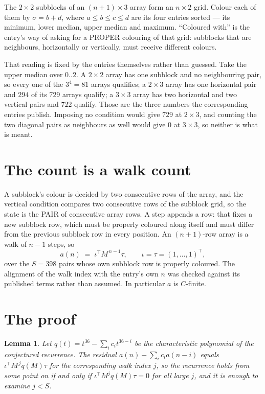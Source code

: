\documentclass[11pt,a4paper]{article}
\theoremstyle{plain}
\newtheorem{lemma}[theorem]{Lemma}
\theoremstyle{definition}
\begin{document}
The $2\times2$ subblocks of an $(n+1)\times3$ array form an
$n\times2$ grid. Colour each of them by $\sigma=b+d$, where $a\le b\le c\le d$ are its four entries sorted --- its minimum, lower median, upper median and maximum. ``Coloured with'' is the entry's way of
asking for a PROPER colouring of that grid: subblocks that are neighbours, horizontally or
vertically, must receive different colours.

That reading is fixed by the entries themselves rather than guessed. Take the upper median
over $0..2$. A $2\times2$ array has one subblock and no neighbouring pair, so every one of the
$3^4=81$ arrays qualifies; a $2\times3$ array has one horizontal pair and $294$ of its $729$
arrays qualify; a $3\times3$ array has two horizontal and two vertical pairs and $722$
qualify. Those are the three numbers the corresponding entries publish. Imposing no condition
would give $729$ at $2\times3$, and counting the two diagonal pairs as neighbours as well
would give $0$ at $3\times3$, so neither is what is meant.

\section{The count is a walk count}

A subblock's colour is decided by two consecutive rows of the array, and
the vertical condition compares two consecutive rows of the subblock grid, so the state is the
PAIR of consecutive array rows. A step appends a row: that fixes a new subblock row, which
must be properly coloured along itself and must differ from the previous subblock row in every
position. An $(n+1)$-row array is a walk of $n-1$ steps, so
\[
a(n)\;=\;\iota^{\!\top}M^{\,n-1}\tau,\qquad\iota=\tau=(1,\dots,1)^{\!\top},
\]
over the $S=398$ pairs whose own subblock row is properly coloured.
The alignment of the walk index with the entry's own $n$ was checked against its published
terms rather than assumed. In particular $a$ is $C$-finite.

\section{The proof}

\begin{lemma}\label{lem:crit}
Let $q(t)=t^{36}-\sum_i c_it^{36-i}$ be the characteristic polynomial of the
conjectured recurrence. The residual $a(n)-\sum_ic_ia(n-i)$ equals
$\iota^{\!\top}M^{\,j}q(M)\tau$ for the corresponding walk index $j$, so the recurrence
holds from some point on if and only if $\iota^{\!\top}M^{j}q(M)\tau=0$ for all large $j$,
and it is enough to examine $j<S$.
\end{lemma}
\end{document}
